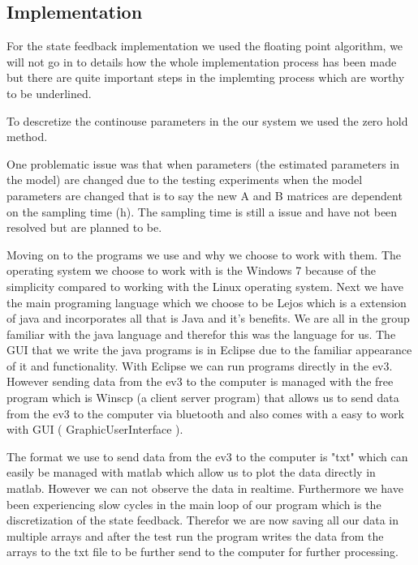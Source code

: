 \documentclass[a4paper]{article}
\begin{document}
\subsection{Implementation}



For the state feedback implementation we used  the floating point algorithm, we will not go in to details how the whole implementation process has been made but there are quite important steps in the implemting process which are worthy to be underlined.

To descretize the continouse parameters in the our system we used the zero hold method.

One problematic issue was that when parameters (the estimated parameters in the model) are changed due to the testing experiments when the model parameters are changed that is to say the new A and B matrices are dependent on the sampling time (h). The sampling time is still a issue and have not been resolved but are planned to be.

Moving on to the programs we use and why we choose to work with them. The operating system we choose to work with is the Windows 7 because of the simplicity compared to working with the Linux operating system. Next we have the main programing language which we choose to be Lejos which is a extension of java and incorporates all that is Java and it's benefits. We are all in the group familiar with the java language and therefor this was the language for us. The GUI that we write the java programs is in Eclipse due to the familiar appearance of it and functionality. With Eclipse we can run programs directly in the ev3. However sending data from the ev3 to the computer is managed with the free program which is Winscp (a client server program) that allows us to send data from the ev3 to the computer via bluetooth and also comes with a easy to work with GUI ( GraphicUserInterface ).

The format we use to send data from the ev3 to the computer is "txt" which can easily be managed with matlab which allow us to plot the data directly in matlab. However we can not observe the data in realtime. Furthermore we have been experiencing slow cycles in the main loop of our program which is the discretization of the state feedback. Therefor we are now saving all our data in multiple arrays and after the test run the program writes the data from the arrays to the txt file to be further send to the computer for further processing.  
\end{document}
